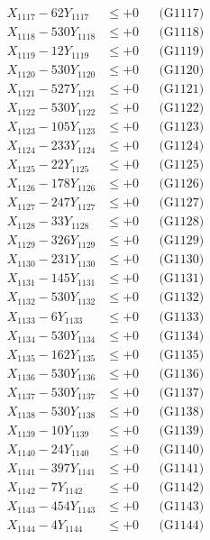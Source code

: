 \documentclass[a4paper,10pt]{article}
\begin{document}
{\begin{align}
X_{1117} - 62Y_{1117} &\leq +0 && \text{(G1117)} \\
X_{1118} - 530Y_{1118} &\leq +0 && \text{(G1118)} \\
X_{1119} - 12Y_{1119} &\leq +0 && \text{(G1119)} \\
X_{1120} - 530Y_{1120} &\leq +0 && \text{(G1120)} \\
\allowbreak
X_{1121} - 527Y_{1121} &\leq +0 && \text{(G1121)} \\
X_{1122} - 530Y_{1122} &\leq +0 && \text{(G1122)} \\
X_{1123} - 105Y_{1123} &\leq +0 && \text{(G1123)} \\
X_{1124} - 233Y_{1124} &\leq +0 && \text{(G1124)} \\
X_{1125} - 22Y_{1125} &\leq +0 && \text{(G1125)} \\
X_{1126} - 178Y_{1126} &\leq +0 && \text{(G1126)} \\
X_{1127} - 247Y_{1127} &\leq +0 && \text{(G1127)} \\
X_{1128} - 33Y_{1128} &\leq +0 && \text{(G1128)} \\
X_{1129} - 326Y_{1129} &\leq +0 && \text{(G1129)} \\
X_{1130} - 231Y_{1130} &\leq +0 && \text{(G1130)} \\
\allowbreak
X_{1131} - 145Y_{1131} &\leq +0 && \text{(G1131)} \\
X_{1132} - 530Y_{1132} &\leq +0 && \text{(G1132)} \\
X_{1133} - 6Y_{1133} &\leq +0 && \text{(G1133)} \\
X_{1134} - 530Y_{1134} &\leq +0 && \text{(G1134)} \\
X_{1135} - 162Y_{1135} &\leq +0 && \text{(G1135)} \\
X_{1136} - 530Y_{1136} &\leq +0 && \text{(G1136)} \\
X_{1137} - 530Y_{1137} &\leq +0 && \text{(G1137)} \\
X_{1138} - 530Y_{1138} &\leq +0 && \text{(G1138)} \\
X_{1139} - 10Y_{1139} &\leq +0 && \text{(G1139)} \\
X_{1140} - 24Y_{1140} &\leq +0 && \text{(G1140)} \\
\allowbreak
X_{1141} - 397Y_{1141} &\leq +0 && \text{(G1141)} \\
X_{1142} - 7Y_{1142} &\leq +0 && \text{(G1142)} \\
X_{1143} - 454Y_{1143} &\leq +0 && \text{(G1143)} \\
X_{1144} - 4Y_{1144} &\leq +0 && \text{(G1144)} \\

\end{align}}
\end{document}

